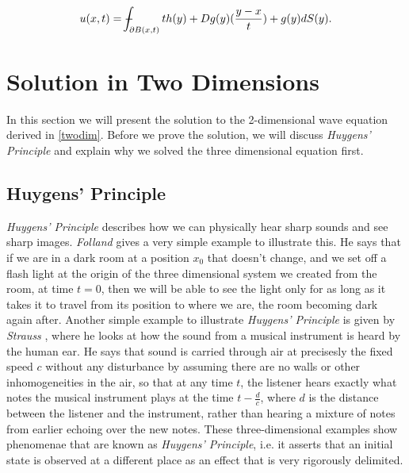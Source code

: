 \documentclass[12pt]{article}
\def\Xint#1{\mathchoice
{\XXint\displaystyle\textstyle{#1}}%
{\XXint\textstyle\scriptstyle{#1}}%
{\XXint\scriptstyle\scriptscriptstyle{#1}}%
{\XXint\scriptscriptstyle\scriptscriptstyle{#1}}%
\!\int}
\def\XXint#1#2#3{{\setbox0=\hbox{$#1{#2#3}{\int}$ }
\vcenter{\hbox{$#2#3$ }}\kern-.6\wd0}}
\def\dashint{\Xint-}
\numberwithin{equation}{section}
\begin{document}
\begin{equation*}
    u(x,t)=\dashint_{\partial B(x,t)}{th(y)+Dg(y)(\frac{y-x}{t})+g(y)dS(y)}.
\end{equation*}

\section{Solution in Two Dimensions}
In this section we will present the solution to the 2-dimensional wave equation derived in \ref{twodim}. Before we prove the solution, we will discuss \emph{Huygens' 
Principle} and explain why we solved the three dimensional equation first.

\subsection{Huygens' Principle}
\emph{Huygens' Principle} describes how we can physically hear sharp sounds and see sharp images. \emph{Folland} \cite{Fol} gives a very simple example to illustrate 
this. He says that if we are in a dark room at a position $x_0$ that doesn't change, and we set off a flash light at the origin of the three dimensional system we 
created from the room, at time $t=0$, then we will be able to see the light only for as long as it takes it to travel from its position to where we are, the room
becoming dark again after. Another simple example to illustrate \emph{Huygens' Principle} is given by \emph{Strauss} \cite{Str}, where he looks at how the sound
from a musical instrument is heard by the human ear. He says that sound is carried through air at precisesly the fixed speed $c$ without any disturbance by assuming
there are no walls or other inhomogeneities in the air, so that at any time $t$, the listener hears exactly what notes the musical instrument plays at the time $t-\frac{d}{c}$,
where $d$ is the distance between the listener and the instrument, rather than hearing a mixture of notes from earlier echoing over the new notes. These three-dimensional 
examples show phenomenae that are known as \emph{Huygens' Principle}, i.e. it asserts that an initial state is observed at a different place as an effect that is 
very rigorously delimited. \cite{Hil} 
\\
\end{document}
